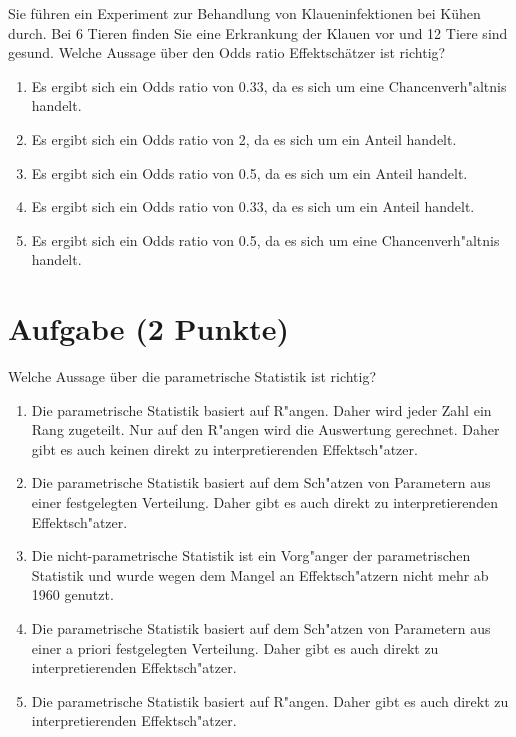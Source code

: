 \documentclass[a4paper, 10pt]{scrartcl}\usepackage[]{graphicx}\usepackage[]{xcolor}
\begin{document}
Sie f{\"u}hren ein Experiment zur Behandlung von Klaueninfektionen bei K{\"u}hen
durch. Bei 6 Tieren finden Sie eine Erkrankung der Klauen vor und
12 Tiere sind gesund. Welche Aussage {\"u}ber den Odds ratio
Effektsch{\"a}tzer ist richtig?



\begin{enumerate}
\item [\textbf{A} \msquare] Es ergibt sich ein Odds ratio von 0.33, da es sich um eine Chancenverh{"a}ltnis handelt.
\item [\textbf{B} \msquare] Es ergibt sich ein Odds ratio von 2, da es sich um ein Anteil handelt.
\item [\textbf{C} \msquare] Es ergibt sich ein Odds ratio von 0.5, da es sich um ein Anteil handelt.
\item [\textbf{D} \msquare] Es ergibt sich ein Odds ratio von 0.33, da es sich um ein Anteil handelt.
\item [\textbf{E} \msquare] Es ergibt sich ein Odds ratio von 0.5, da es sich um eine Chancenverh{"a}ltnis handelt.
\end{enumerate}

\section{Aufgabe \hfill (2 Punkte)}




Welche Aussage {\"u}ber die parametrische Statistik ist richtig?



\begin{enumerate}
\item [\textbf{A} \msquare] Die parametrische Statistik basiert auf R{"a}ngen. Daher wird jeder Zahl ein Rang zugeteilt. Nur auf den R{"a}ngen wird die Auswertung gerechnet. Daher gibt es auch keinen direkt zu interpretierenden Effektsch{"a}tzer.
\item [\textbf{B} \msquare] Die parametrische Statistik basiert auf dem Sch{"a}tzen von Parametern aus einer festgelegten Verteilung. Daher gibt es auch direkt zu interpretierenden Effektsch{"a}tzer.
\item [\textbf{C} \msquare] Die nicht-parametrische Statistik ist ein Vorg{"a}nger der parametrischen Statistik und wurde wegen dem Mangel an Effektsch{"a}tzern nicht mehr ab 1960 genutzt.
\item [\textbf{D} \msquare] Die parametrische Statistik basiert auf dem Sch{"a}tzen von Parametern aus einer a priori festgelegten Verteilung. Daher gibt es auch direkt zu interpretierenden Effektsch{"a}tzer.
\item [\textbf{E} \msquare] Die parametrische Statistik basiert auf R{"a}ngen. Daher gibt es auch direkt zu interpretierenden Effektsch{"a}tzer.
\end{enumerate}
\end{document}
